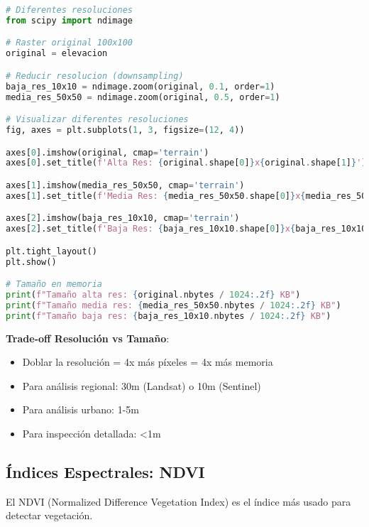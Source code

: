 \documentclass[11pt,a4paper]{article}
\newcommand{\importante}[1]{\begin{tcolorbox}[colback=yellow!10,colframe=orange,title={Importante}]#1\end{tcolorbox}}
\begin{document}
\begin{lstlisting}[language=Python]
# Diferentes resoluciones
from scipy import ndimage

# Raster original 100x100
original = elevacion

# Reducir resolucion (downsampling)
baja_res_10x10 = ndimage.zoom(original, 0.1, order=1)
media_res_50x50 = ndimage.zoom(original, 0.5, order=1)

# Visualizar diferentes resoluciones
fig, axes = plt.subplots(1, 3, figsize=(12, 4))

axes[0].imshow(original, cmap='terrain')
axes[0].set_title(f'Alta Res: {original.shape[0]}x{original.shape[1]}')

axes[1].imshow(media_res_50x50, cmap='terrain')
axes[1].set_title(f'Media Res: {media_res_50x50.shape[0]}x{media_res_50x50.shape[1]}')

axes[2].imshow(baja_res_10x10, cmap='terrain')
axes[2].set_title(f'Baja Res: {baja_res_10x10.shape[0]}x{baja_res_10x10.shape[1]}')

plt.tight_layout()
plt.show()

# Tamaño en memoria
print(f"Tamaño alta res: {original.nbytes / 1024:.2f} KB")
print(f"Tamaño media res: {media_res_50x50.nbytes / 1024:.2f} KB")
print(f"Tamaño baja res: {baja_res_10x10.nbytes / 1024:.2f} KB")
\end{lstlisting}

\importante{
\textbf{Trade-off Resolución vs Tamaño}: 
\begin{itemize}
    \item Doblar la resolución = 4x más píxeles = 4x más memoria
    \item Para análisis regional: 30m (Landsat) o 10m (Sentinel)
    \item Para análisis urbano: 1-5m
    \item Para inspección detallada: <1m
\end{itemize}
}

\subsection{Índices Espectrales: NDVI}

El NDVI (Normalized Difference Vegetation Index) es el índice más usado para detectar vegetación.
\end{document}
